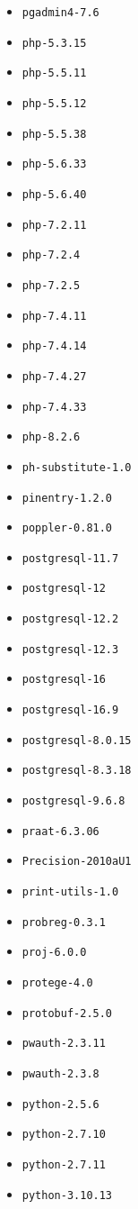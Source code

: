 \begin{multicols}{3}
\begin{itemize}
\item \verb|pgadmin4-7.6|
\item \verb|php-5.3.15|
\item \verb|php-5.5.11|
\item \verb|php-5.5.12|
\item \verb|php-5.5.38|
\item \verb|php-5.6.33|
\item \verb|php-5.6.40|
\item \verb|php-7.2.11|
\item \verb|php-7.2.4|
\item \verb|php-7.2.5|
\item \verb|php-7.4.11|
\item \verb|php-7.4.14|
\item \verb|php-7.4.27|
\item \verb|php-7.4.33|
\item \verb|php-8.2.6|
\item \verb|ph-substitute-1.0|
\item \verb|pinentry-1.2.0|
\item \verb|poppler-0.81.0|
\item \verb|postgresql-11.7|
\item \verb|postgresql-12|
\item \verb|postgresql-12.2|
\item \verb|postgresql-12.3|
\item \verb|postgresql-16|
\item \verb|postgresql-16.9|
\item \verb|postgresql-8.0.15|
\item \verb|postgresql-8.3.18|
\item \verb|postgresql-9.6.8|
\item \verb|praat-6.3.06|
\item \verb|Precision-2010aU1|
\item \verb|print-utils-1.0|
\item \verb|probreg-0.3.1|
\item \verb|proj-6.0.0|
\item \verb|protege-4.0|
\item \verb|protobuf-2.5.0|
\item \verb|pwauth-2.3.11|
\item \verb|pwauth-2.3.8|
\item \verb|python-2.5.6|
\item \verb|python-2.7.10|
\item \verb|python-2.7.11|
\item \verb|python-3.10.13|

\end{itemize}
\end{multicols}
